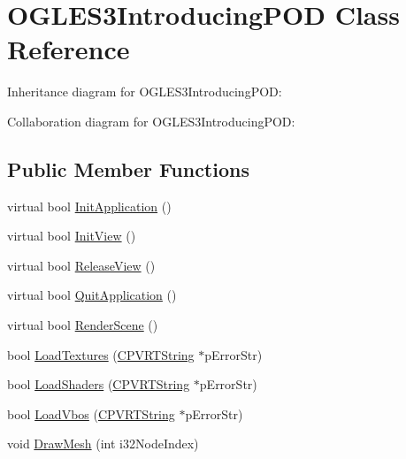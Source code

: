 \hypertarget{class_o_g_l_e_s3_introducing_p_o_d}{\section{O\+G\+L\+E\+S3\+Introducing\+P\+O\+D Class Reference}
\label{class_o_g_l_e_s3_introducing_p_o_d}
}


Inheritance diagram for O\+G\+L\+E\+S3\+Introducing\+P\+O\+D\+:


Collaboration diagram for O\+G\+L\+E\+S3\+Introducing\+P\+O\+D\+:
\subsection*{Public Member Functions}
\begin{DoxyCompactItemize}
\item 
virtual bool \hyperlink{class_o_g_l_e_s3_introducing_p_o_d_a302bedfdd663c356b03e8e16bd1e4daf}{Init\+Application} ()
\item 
virtual bool \hyperlink{class_o_g_l_e_s3_introducing_p_o_d_a782c52b5ecda4997679950037750de6b}{Init\+View} ()
\item 
virtual bool \hyperlink{class_o_g_l_e_s3_introducing_p_o_d_ac0a6f55e892931b6b0a9a8c355168190}{Release\+View} ()
\item 
virtual bool \hyperlink{class_o_g_l_e_s3_introducing_p_o_d_aa8eabe74ef0ea7b0461ec537264a0ee8}{Quit\+Application} ()
\item 
virtual bool \hyperlink{class_o_g_l_e_s3_introducing_p_o_d_a7a23ded9eef171ef22f19791060fb87d}{Render\+Scene} ()
\item 
bool \hyperlink{class_o_g_l_e_s3_introducing_p_o_d_af5cc40146892d1e0e51e68e4b0e52ecc}{Load\+Textures} (\hyperlink{class_c_p_v_r_t_string}{C\+P\+V\+R\+T\+String} $\ast$p\+Error\+Str)
\item 
bool \hyperlink{class_o_g_l_e_s3_introducing_p_o_d_a23250e25bfe3a81f0c2a92d881b1e6c9}{Load\+Shaders} (\hyperlink{class_c_p_v_r_t_string}{C\+P\+V\+R\+T\+String} $\ast$p\+Error\+Str)
\item 
bool \hyperlink{class_o_g_l_e_s3_introducing_p_o_d_ae231a1ce71a0ad4b16266a553bdb4bd2}{Load\+Vbos} (\hyperlink{class_c_p_v_r_t_string}{C\+P\+V\+R\+T\+String} $\ast$p\+Error\+Str)
\item 
void \hyperlink{class_o_g_l_e_s3_introducing_p_o_d_a0fc6ee11d86637098703c3d7b930d124}{Draw\+Mesh} (int i32\+Node\+Index)
\end{DoxyCompactItemize}


